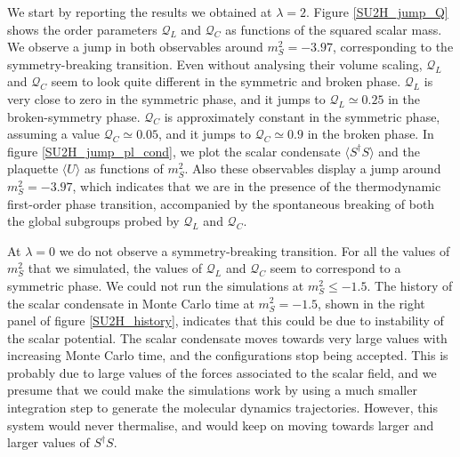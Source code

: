 We start by reporting the results we obtained at $\lambda = 2$. Figure \ref{SU2H_jump_Q} shows the order parameters $\mathcal Q_L$ and $\mathcal Q_C$ as functions of the squared scalar mass. We observe a jump in both observables around $m_S^2 = -3.97$, corresponding to the symmetry-breaking transition. Even without analysing their volume scaling, $\mathcal Q_L$ and $\mathcal Q_C$ seem to look quite different in the symmetric and broken phase. $\mathcal Q_L$ is very close to zero in the symmetric phase, and  it jumps to $\mathcal Q_L \simeq 0.25$ in the broken-symmetry phase. $\mathcal Q_C$ is approximately constant in the symmetric phase, assuming a value $\mathcal Q_C \simeq 0.05$, and it jumps to $\mathcal Q_C \simeq 0.9$ in the broken phase. In figure \ref{SU2H_jump_pl_cond}, we plot the scalar condensate $\langle S^{\dagger}S \rangle$ and the plaquette $\langle U \rangle$ as functions of $m_S^2$. Also these observables display a jump around $m_S^2 = -3.97$, which indicates that we are in the presence of the thermodynamic first-order phase transition, accompanied by the spontaneous breaking of both the global subgroups probed by $\mathcal Q_L$ and $\mathcal Q_C$.

At $\lambda = 0$ we do not observe a symmetry-breaking transition. For all the values of $m_S^2$ that we simulated, the values of $\mathcal Q_L$ and $\mathcal Q_C$ seem to correspond to a symmetric phase. We could not run the simulations at $m_S^2 \leq -1.5$. The history of the scalar condensate in Monte Carlo time at $m_S^2 = -1.5$, shown in the right panel of figure \ref{SU2H_history}, indicates that this could be due to instability of the scalar potential. The scalar condensate moves towards very large values with increasing Monte Carlo time, and the configurations stop being accepted. This is probably due to large values of the forces associated to the scalar field, and we presume that we could make the simulations work by using a much smaller integration step to generate the molecular dynamics trajectories. However, this system would never thermalise, and would keep on moving towards larger and larger values of $S^{\dagger} S$.


